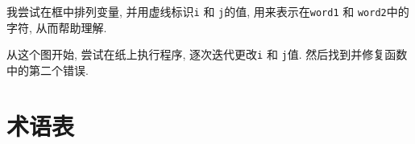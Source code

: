 \documentclass[10pt]{book}
\begin{document}
我尝试在框中排列变量, 并用虚线标识{\tt i} 和
{\tt j}的值, 用来表示在{\tt word1} 和 {\tt word2}中的字符, 
从而帮助理解. 


从这个图开始, 尝试在纸上执行程序, 逐次迭代更改{\tt i} 和 {\tt j}值. 
然后找到并修复函数中的第二个错误. 
\label{isreverse}


\section{术语表}
\end{document}
